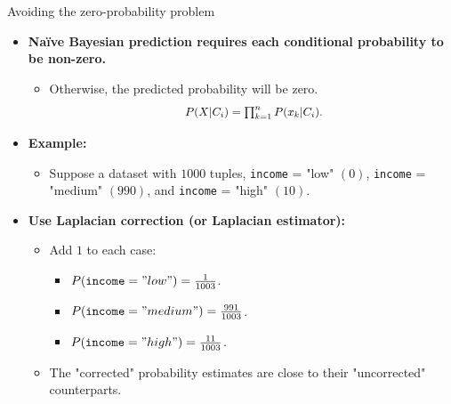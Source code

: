 \documentclass[aspectratio=169,t,table]{beamer}
\begin{document}
  {
    \begin{frame}{Avoiding the zero-probability problem}
      \begin{itemize}
        \item \textbf{Naïve Bayesian prediction requires each conditional probability to be non-zero.}
        \begin{itemize}
          \item Otherwise, the predicted probability will be zero.
          \begin{align}
            \resizebox{4cm}{!}{
            $P(X|C_i) = \prod_{k=1}^{n} P(x_k|C_i).$}
          \end{align}
        \end{itemize}
        \item \textbf{Example:}
        \begin{itemize}
          \item Suppose a dataset with $1000$ tuples, \texttt{income} = "low" $(0)$, \texttt{income} = "medium" $(990)$, and \texttt{income} = "high" $(10)$.
        \end{itemize}
        \item \textbf{Use {\color{airforceblue}Laplacian correction} (or Laplacian estimator):}
        \begin{itemize}
          \item Add $1$ to each case:
          \begin{itemize}
            \item $P(\texttt{income} = "low") = \frac{1}{1003}$.
            \item $P(\texttt{income} = "medium") = \frac{991}{1003}$.
            \item $P(\texttt{income} = "high") = \frac{11}{1003}$.
          \end{itemize}
          \item The "corrected" probability estimates are close to their "uncorrected" counterparts.
        \end{itemize}
      \end{itemize}
    \end{frame}
  }
\end{document}
